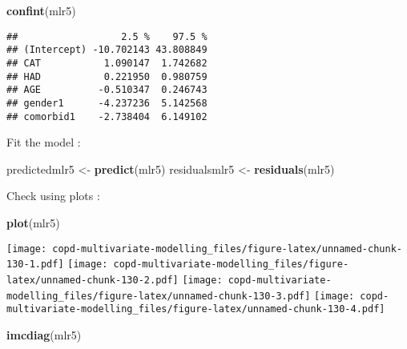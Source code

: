\documentclass[
]{article}
\newenvironment{Shaded}{\begin{snugshade}}{\end{snugshade}}
\newcommand{\FunctionTok}[1]{\textcolor[rgb]{0.13,0.29,0.53}{\textbf{#1}}}
\newcommand{\NormalTok}[1]{#1}
\newcommand{\OtherTok}[1]{\textcolor[rgb]{0.56,0.35,0.01}{#1}}
\begin{document}
\begin{Shaded}
\begin{Highlighting}[]
\FunctionTok{confint}\NormalTok{(mlr5)}
\end{Highlighting}
\end{Shaded}

\begin{verbatim}
##                  2.5 %    97.5 %
## (Intercept) -10.702143 43.808849
## CAT           1.090147  1.742682
## HAD           0.221950  0.980759
## AGE          -0.510347  0.246743
## gender1      -4.237236  5.142568
## comorbid1    -2.738404  6.149102
\end{verbatim}

Fit the model :

\begin{Shaded}
\begin{Highlighting}[]
\NormalTok{predictedmlr5 }\OtherTok{\textless{}{-}} \FunctionTok{predict}\NormalTok{(mlr5)}
\NormalTok{residualsmlr5 }\OtherTok{\textless{}{-}} \FunctionTok{residuals}\NormalTok{(mlr5)}
\end{Highlighting}
\end{Shaded}

Check using plots :

\begin{Shaded}
\begin{Highlighting}[]
\FunctionTok{plot}\NormalTok{(mlr5)}
\end{Highlighting}
\end{Shaded}

\texttt{[image: copd-multivariate-modelling\_files/figure-latex/unnamed-chunk-130-1.pdf]}
\texttt{[image: copd-multivariate-modelling\_files/figure-latex/unnamed-chunk-130-2.pdf]}
\texttt{[image: copd-multivariate-modelling\_files/figure-latex/unnamed-chunk-130-3.pdf]}
\texttt{[image: copd-multivariate-modelling\_files/figure-latex/unnamed-chunk-130-4.pdf]}

\begin{Shaded}
\begin{Highlighting}[]
\FunctionTok{imcdiag}\NormalTok{(mlr5)}
\end{Highlighting}
\end{Shaded}
\end{document}
